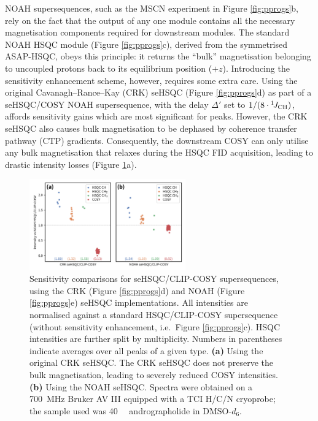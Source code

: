 \documentclass[11pt]{article}
\newcommand*{\onejch}{{}^{1}\!J_{\ce{CH}}}
\newcommand*{\figref}[1]{Figure \ref{fig:#1}}
\newcommand*{\andro}{Spectra were obtained on a \SI{700}{\MHz} Bruker AV III equipped with a TCI H/C/N cryoprobe; the sample used was \SI{40}{\milli\molar} andrographolide in DMSO-$d_6$.}
\begin{document}
NOAH supersequences, such as the MSCN experiment in \figref{pprogs}b, rely on the fact that the output of any one module contains all the necessary magnetisation components required for downstream modules.
The standard NOAH HSQC module (\figref{pprogs}c), derived from the symmetrised ASAP-HSQC,\autocite{asaphsqc} obeys this principle: it returns the ``bulk'' magnetisation belonging to uncoupled protons back to its equilibrium position ($+z$).
Introducing the sensitivity enhancement scheme, however, requires some extra care.
Using the original Cavanagh--Rance--Kay (CRK) seHSQC (\figref{pprogs}d) as part of a seHSQC/COSY NOAH supersequence, with the delay $\Delta'$ set to $1/(8 \cdot \onejch)$, affords sensitivity gains which are most significant for  peaks.\autocite{sehsqc_sens}
However, the CRK seHSQC also causes bulk magnetisation to be dephased by coherence transfer pathway (CTP) gradients.
Consequently, the downstream COSY can only utilise any bulk magnetisation that relaxes during the HSQC FID acquisition, leading to drastic intensity losses (\figref{spor_spv2}a).

\begin{figure}
    \centering
    \includegraphics[width=0.6\textwidth]{figures/spor_spv2_comp.png}
    \caption{
        Sensitivity comparisons for seHSQC/CLIP-COSY\autocite{Koos2016ACIE} supersequences, using the CRK (\figref{pprogs}d) and NOAH (\figref{pprogs}e) seHSQC implementations.
        All intensities are normalised against a standard HSQC/CLIP-COSY supersequence (without sensitivity enhancement, i.e.\ \figref{pprogs}c).
        HSQC intensities are further split by multiplicity.
        Numbers in parentheses indicate averages over all peaks of a given type.
        \textbf{(a)} Using the original CRK seHSQC.
        The CRK seHSQC does not preserve the bulk magnetisation, leading to severely reduced COSY intensities.
        \textbf{(b)} Using the NOAH seHSQC.
        \andro{}
    }
    \label{fig:spor_spv2}
\end{figure}
\end{document}
